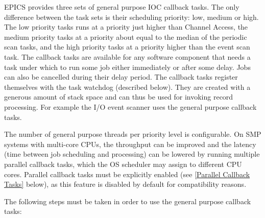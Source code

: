 EPICS provides three sets of general purpose IOC callback tasks. The only difference between the task sets is their scheduling 
priority: low, medium or high. The low priority tasks runs at a priority just higher than Channel Access, the medium priority tasks at a 
priority about equal to the median of the periodic scan tasks, and the high priority tasks at a priority higher than the event scan task. The 
callback tasks are available for any software component that needs a task under which to run some job either immediately 
or after some delay. Jobs can also be cancelled during their delay period. The callback tasks register themselves with 
the task watchdog (described below). They are created with a generous amount of stack space and can thus be used for 
invoking record processing. For example the I/O event scanner uses the general purpose callback tasks.

The number of general purpose threads per priority level is configurable.
On SMP systems with multi-core CPUs, the throughput can be improved and the latency (time between job scheduling and processing) can be lowered by running multiple parallel callback tasks, which the OS scheduler may assign to different CPU cores. Parallel callback tasks must be explicitly enabled (see \ref{Parallel Callback Tasks} below), as this feature is disabled by default for compatibility reasons.

The following steps must be taken in order to use the general purpose callback tasks: 

